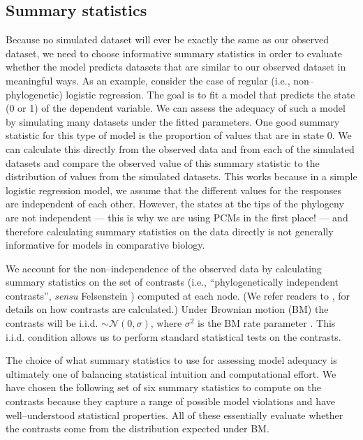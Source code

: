 \documentclass[a4paper,12pt]{article}
\begin{document}
\subsection{Summary statistics}
Because no simulated dataset will ever be exactly the same as our observed dataset, we need to choose informative summary statistics in order to evaluate whether the model predicts datasets that are similar to our observed dataset in meaningful ways. As an example, consider the case of regular (i.e., non--phylogenetic) logistic regression. The goal is to fit a model that predicts the state (0 or 1) of the dependent variable. We can assess the adequacy of such a model by simulating many datasets under the fitted parameters. One good summary statistic for this type of model is the proportion of values that are in state 0. We can calculate this directly from the observed data and from each of the simulated datasets and compare the observed value of this summary statistic to the distribution of values from the simulated datasets. This works because in a simple logistic regression model, we assume that the different values for the responses are independent of each other. However, the states at the tips of the phylogeny are not independent --- this is why we are using PCMs in the first place! --- and therefore calculating summary statistics on the data directly is not generally informative for models in comparative biology. 

We account for the non--independence of the observed data by calculating summary statistics on the set of contrasts (i.e., ``phylogenetically independent contrasts'', \emph{sensu} Felsenstein \citep{Felsenstein1985}) computed at each node. (We refer readers to \citep{Felsenstein1985, Rohlf2001, Blomberg2012}, for details on how contrasts are calculated.) Under Brownian motion (BM) the contrasts will be i.i.d. $\sim \mathcal{N}(0, \sigma)$, where $\sigma^2$ is the BM rate parameter \citep{Felsenstein1985}. This i.i.d. condition allows us to perform standard statistical tests on the contrasts. 

The choice of what summary statistics to use for assessing model adequacy is ultimately one of balancing statistical intuition and computational effort. We have chosen the following set of six summary statistics to compute on the contrasts because they capture a range of possible model violations and have well--understood statistical properties. All of these essentially evaluate whether the contrasts come from the distribution expected under BM. 
\end{document}

